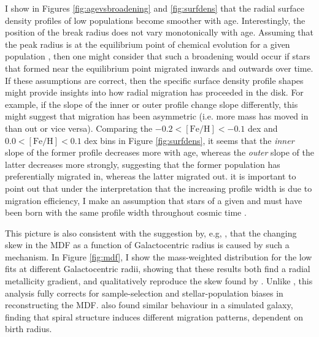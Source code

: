 I show in Figures \ref{fig:agevsbroadening} and \ref{fig:surfdens}  that the radial surface density profiles of low \afe{} populations become smoother with age. Interestingly, the position of the break radius does not vary monotonically with age. Assuming that the peak radius is at the equilibrium point of chemical evolution for a given population  \citep[where the consumption of gas and its dilution are balanced, as discussed in][]{2016ApJ...823...30B}, then one might consider that such a broadening would occur if stars that formed near the equilibrium point migrated inwards and outwards over time.  If these assumptions are correct, then the specific surface density profile shapes might provide insights into how radial migration has proceeded in the disk. For example, if the slope of the inner or outer profile change slope differently, this might suggest that migration has been asymmetric (i.e. more mass has moved in than out or vice versa). Comparing the $-0.2 <\mathrm{[Fe/H]}<-0.1$ dex and $0.0 <\mathrm{[Fe/H]}<0.1$ dex bins in Figure \ref{fig:surfdens}, it seems that the \emph{inner} slope of the former profile decreases more with age, whereas the \emph{outer} slope of the latter decreases more strongly, suggesting that the former population has preferentially migrated in, whereas the latter migrated out.  it is important to point out that under the interpretation that the increasing profile width is due to migration efficiency, I make an assumption that stars of a given \feh{} and \afe{} must have been born with the same profile width throughout cosmic time \citep[as discussed by, e.g.][]{2017ApJ...834...27M}.


This picture is also consistent with the suggestion by, e.g, \citet[][]{2015ApJ...808..132H,2011ApJ...737....8L}, that the changing skew in the MDF as a function of Galactocentric radius is caused by such a mechanism. In Figure \ref{fig:mdf}, I show the mass-weighted \feh{} distribution for the low \afe{} fits at different Galactocentric radii, showing that these results both find a radial metallicity gradient, and qualitatively reproduce the skew found by \citet[][]{2015ApJ...808..132H}. Unlike \citet[][]{2015ApJ...808..132H}, this analysis fully corrects for sample-selection and stellar-population biases in reconstructing the MDF. \citet{2016MNRAS.460L..94G} also found similar behaviour in a simulated galaxy, finding that spiral structure induces different migration patterns, dependent on birth radius. 

